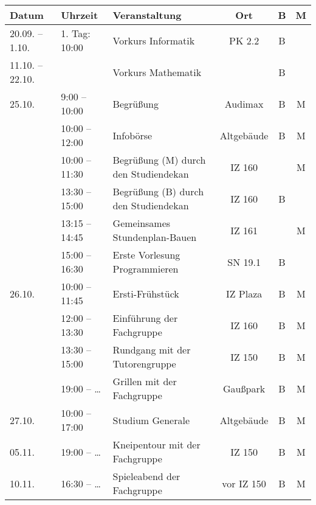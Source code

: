 
\begin{tabular}{|l|l|p{6.7cm}|c|c|c|}
\hline \textbf{Datum} & \textbf{Uhrzeit} & \textbf{Veranstaltung}	& \textbf{Ort} & \textbf{B} & \textbf{M} \\
\hline 20.09. – 1.10.	& 1. Tag: 10:00	 & Vorkurs Informatik						& PK 2.2		&B& \\
\hline 11.10. – 22.10. 	&		 & Vorkurs Mathematik 								&				&B& \\
\hline 25.10.	&  9:00 – 10:00	 & Begrüßung										& Audimax		&B&M\\ %
\hline 			& 10:00 – 12:00	 & Infobörse										& Altgebäude	&B&M\\
\hline  	& 10:00 – 11:30	 & Begrüßung (M) \newline durch den Studiendekan	& IZ 160	& &M\\
\hline 			& 13:30 – 15:00	 & Begrüßung (B) \newline durch den Studiendekan	& IZ 160	&B& \\
\hline 			& 13:15 – 14:45	 & Gemeinsames Stundenplan-Bauen					& IZ 161		& &M\\
\hline 			& 15:00 – 16:30	 & Erste Vorlesung Programmieren					& SN 19.1		&B& \\
\hline 26.10.	& 10:00 – 11:45	 & Ersti-Frühstück									& IZ Plaza		&B&M\\
\hline 			& 12:00 – 13:30	 & Einführung  der Fachgruppe					& IZ 160		&B&M\\
\hline 			& 13:30 – 15:00	 & Rundgang  \newline mit der Tutorengruppe		& IZ 150		&B&M \\
\hline 			& 19:00 – \ldots & Grillen mit der Fachgruppe						& Gaußpark		&B&M\\
\hline 27.10.	& 10:00 – 17:00	 & Studium Generale									& Altgebäude	&B&M\\
\hline 05.11.	& 19:00 – \ldots & Kneipentour mit der Fachgruppe					& IZ 150		&B&M\\
\hline 10.11.	& 16:30 – \ldots & Spieleabend der Fachgruppe						& vor IZ 150	&B&M\\ 
\hline
\end{tabular} 
